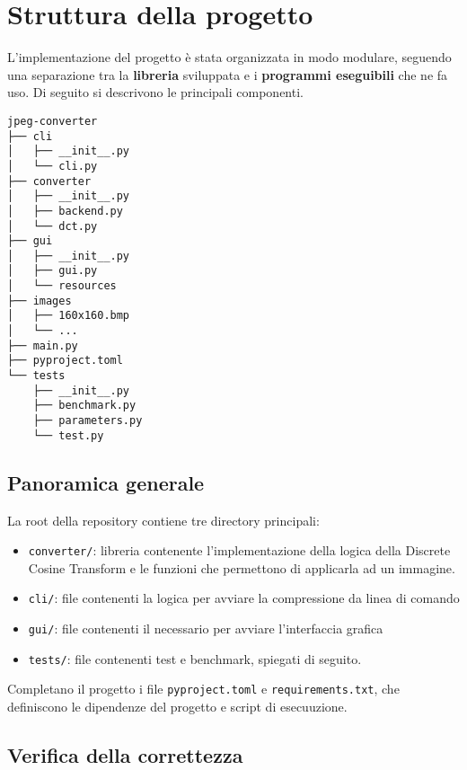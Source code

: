 \section{Struttura della progetto}
L’implementazione del progetto è stata organizzata in modo modulare, seguendo una separazione tra la \textbf{libreria} sviluppata e i \textbf{programmi eseguibili} che ne fa uso. Di seguito si descrivono le principali componenti.

\begin{footnotesize}
\begin{verbatim}
jpeg-converter
├── cli
│   ├── __init__.py
│   └── cli.py
├── converter
│   ├── __init__.py
│   ├── backend.py
│   └── dct.py
├── gui
│   ├── __init__.py
│   ├── gui.py
│   └── resources
├── images
│   ├── 160x160.bmp
│   └── ...
├── main.py
├── pyproject.toml
└── tests
    ├── __init__.py
    ├── benchmark.py
    ├── parameters.py
    └── test.py
\end{verbatim}
\end{footnotesize}

\subsection{Panoramica generale}

La root della repository contiene tre directory principali:

\begin{itemize}
    \item \texttt{converter/}: libreria contenente l’implementazione della logica della Discrete Cosine Transform e le funzioni che permettono di applicarla ad un immagine.
    \item \texttt{cli/}: file contenenti la logica per avviare la compressione da linea di comando
    \item \texttt{gui/}: file contenenti il necessario per avviare l'interfaccia grafica
    \item \texttt{tests/}: file contenenti test e benchmark, spiegati di seguito.
\end{itemize}

Completano il progetto i file \texttt{pyproject.toml} e \texttt{requirements.txt}, che definiscono le dipendenze del progetto e script di esecuuzione.

\subsection{Verifica della correttezza}

